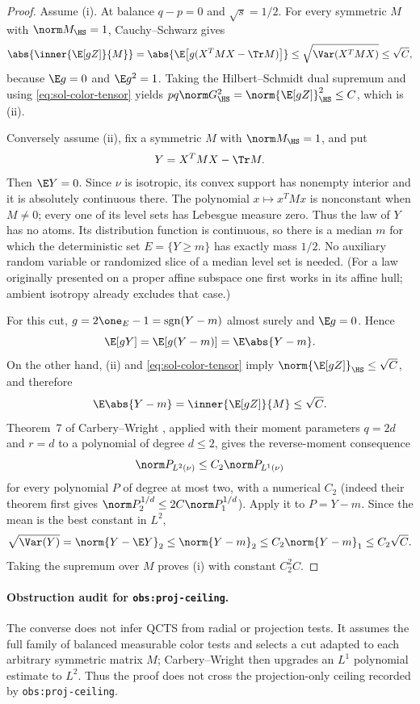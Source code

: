 \documentclass[../main.tex]{subfiles}
\begin{document}
\begin{proof}
Assume (i).  At balance $q-p=0$ and $\sqrt{s}=1/2$.  For every symmetric
$M$ with $\norm M_\HS=1$, Cauchy--Schwarz gives
\[
 \abs{\inner{\E[gZ]}{M}}
 =\abs{\E\bigl[g(X^TMX-\Tr M)\bigr]}
 \le\sqrt{\Var(X^TMX)}\le\sqrt C,
\]
because $\E g=0$ and $\E g^2=1$.  Taking the Hilbert--Schmidt dual supremum and using
\eqref{eq:sol-color-tensor} yields
$pq\norm G_\HS^2=\norm{\E[gZ]}_\HS^2\le C$, which is (ii).

Conversely assume (ii), fix a symmetric $M$ with $\norm M_\HS=1$, and put
\[
 Y=X^TMX-\Tr M.
\]
Then $\E Y=0$.  Since $\nu$ is isotropic, its convex support has nonempty interior and it is
absolutely continuous there.  The polynomial $x\mapsto x^TMx$ is nonconstant when $M\ne0$;
every one of its level sets has Lebesgue measure zero.  Thus the law of $Y$ has no atoms.
Its distribution function is continuous, so there is a median $m$ for which the deterministic
set $E=\{Y\ge m\}$ has exactly mass $1/2$.  No auxiliary random variable or randomized slice of
a median level set is needed.  (For a law originally presented on a proper affine subspace one
first works in its affine hull; ambient isotropy already excludes that case.)

For this cut, $g=2\one_E-1=\operatorname{sgn}(Y-m)$ almost surely and $\E g=0$.  Hence
\begin{equation}\label{eq:sol-median-L1}
 \E[gY]=\E[g(Y-m)]=\E\abs{Y-m}.
\end{equation}
On the other hand, (ii) and \eqref{eq:sol-color-tensor} imply
$\norm{\E[gZ]}_\HS\le\sqrt C$, and therefore
\[
 \E\abs{Y-m}=\inner{\E[gZ]}{M}\le\sqrt C.
\]
Theorem~7 of Carbery--Wright \cite{CarberyWright2001}, applied with their moment parameters
$q=2d$ and $r=d$ to a polynomial of degree $d\le2$, gives the reverse-moment consequence
\begin{equation}\label{eq:sol-CW-reverse}
 \norm P_{L^2(\nu)}\le C_2\norm P_{L^1(\nu)}
\end{equation}
for every polynomial $P$ of degree at most two, with a numerical $C_2$ (indeed their theorem
first gives $\norm P_2^{1/d}\le2C\norm P_1^{1/d}$).  Apply it to $P=Y-m$.  Since the mean is
the best constant in
$L^2$,
\[
 \sqrt{\Var(Y)}=\norm{Y-\E Y}_2\le\norm{Y-m}_2
 \le C_2\norm{Y-m}_1\le C_2\sqrt C.
\]
Taking the supremum over $M$ proves (i) with constant $C_2^2C$.
\end{proof}

\paragraph{Obstruction audit for \texttt{obs:proj-ceiling}.}
The converse does not infer QCTS from radial or projection tests.  It assumes the full family of
balanced measurable color tests and selects a cut adapted to each arbitrary symmetric matrix
$M$; Carbery--Wright then upgrades an $L^1$ polynomial estimate to $L^2$.  Thus the proof does
not cross the projection-only ceiling recorded by \texttt{obs:proj-ceiling}.
\end{document}
